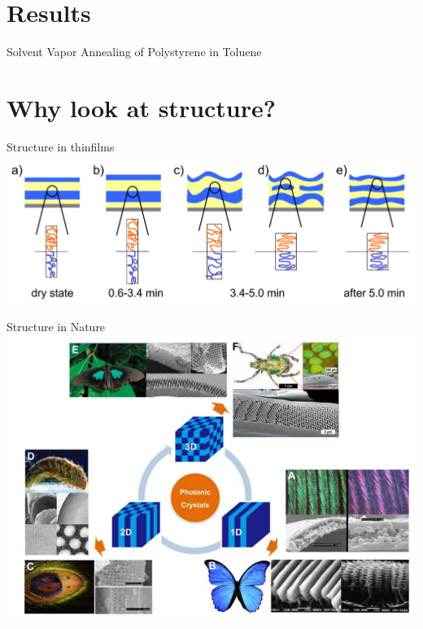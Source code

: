 \documentclass[10pt]{beamer}
\begin{document}
\section{Results}

\begin{frame}{Solvent Vapor Annealing of Polystyrene in Toluene}

\end{frame}

\section{Why look at structure?}

\begin{frame}{Structure in thinfilms}
\includegraphics[width=\textwidth]{multipolymer.png}
\end{frame}


\begin{frame}{Structure in Nature}
\includegraphics[width=\textwidth]{structure.png}
\end{frame}
\end{document}
